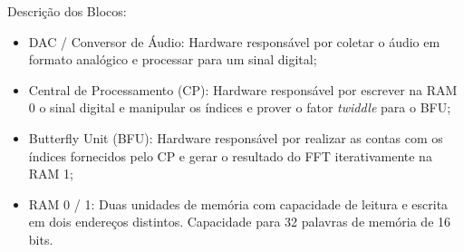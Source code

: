 \documentclass{article}
\newcommand{\tit}[1]{\textit{#1}}
\begin{document}
Descrição dos Blocos:
\begin{itemize}
    \item DAC / Conversor de Áudio: Hardware responsável por coletar o áudio em formato analógico
    e processar para um sinal digital;
    \item Central de Processamento (CP): Hardware responsável por escrever na RAM 0 o sinal digital e
    manipular os índices e prover o fator \tit{twiddle} para o BFU;
    \item Butterfly Unit (BFU): Hardware responsável por realizar as contas com os índices fornecidos
    pelo CP e gerar o resultado do FFT iterativamente na RAM 1;
    \item RAM 0 / 1: Duas unidades de memória com capacidade de leitura e escrita em dois endereços distintos.
    Capacidade para 32 palavras de memória de 16 bits.
\end{itemize}

\newpage


\end{document}
